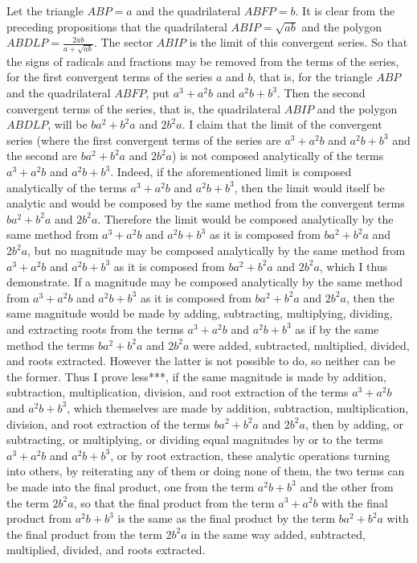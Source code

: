 \documentclass[11pt,letterpaper]{book}
\begin{document}
Let the triangle $ABP = a$ and the quadrilateral $ABFP = b$. It is clear from the
preceding propositions that the quadrilateral $ABIP = \sqrt{ab}$ and the polygon $ABDLP
= \frac{2ab}{a+\sqrt{ab}}$. The sector $ABIP$ is the limit of this convergent
series. So that the signs of radicals and fractions may be removed from the
terms of the series, for the first convergent terms of the series $a$ and $b$,
that is, for the triangle $ABP$ and the quadrilateral $ABFP$, put $a^{3}+a^{2}b$
and $a^{2}b+b^{3}$. Then the second convergent terms of the series, that is, the
quadrilateral $ABIP$ and the polygon $ABDLP$, will be $ba^{2}+b^{2}a$ and $2b^{2}a$. I
claim that the limit of the convergent series (where the first convergent terms
of the series are $a^{3}+a^{2}b$ and $a^{2}b+b^{3}$ and the second are
$ba^{2}+b^{2}a$ and $2b^{2}a$) is not composed analytically of the terms
$a^{3}+a^{2}b$ and $a^{2}b+b^{3}$. Indeed, if the aforementioned limit is
composed analytically of the terms $a^{3}+a^{2}b$ and $a^{2}b+b^{3}$, then the
limit would itself be analytic and would be composed by the same method from
the convergent terms $ba^{2}+b^{2}a$ and $2b^{2}a$. Therefore the limit would
be composed analytically by the same method from $a^{3}+a^{2}b$ and
$a^{2}b+b^{3}$ as it is composed from $ba^{2}+b^{2}a$ and $2b^{2}a$, but no
magnitude may be composed analytically by the same method from $a^{3}+a^{2}b$
and $a^{2}b+b^{3}$ as it is composed from $ba^{2}+b^{2}a$ and $2b^{2}a$, which
I thus demonstrate. If a magnitude may be composed analytically by the same
method from $a^{3}+a^{2}b$ and $a^{2}b+b^{3}$ as it is composed from
$ba^{2}+b^{2}a$ and $2b^{2}a$, then the same magnitude would be made by adding,
subtracting, multiplying, dividing, and extracting roots from the terms
$a^{3}+a^{2}b$ and $a^{2}b+b^{3}$ as if by the same method the terms
$ba^{2}+b^{2}a$ and $2b^{2}a$ were added, subtracted, multiplied, divided, and
roots extracted. However the latter is not possible to do, so neither can be
the former. Thus I prove less***, if the same magnitude is made by addition,
subtraction, multiplication, division, and root extraction of the terms
$a^{3}+a^{2}b$ and $a^{2}b+b^{3}$, which themselves are made by addition,
subtraction, multiplication, division, and root extraction of the terms
$ba^{2}+b^{2}a$ and $2b^{2}a$, then by adding, or subtracting, or multiplying,
or dividing equal magnitudes by or to the terms $a^{3}+a^{2}b$ and
$a^{2}b+b^{3}$, or by root extraction, these analytic operations turning into
others, by reiterating any of them or doing none of them, the two terms can be
made into the final product, one from the term $a^{2}b+b^{3}$ and the other from
the term $2b^{2}a$, so that the final product from the term $a^{3}+a^{2}b$ with
the final product from $a^{2}b+b^{3}$ is the same as the final product by the
term $ba^{2}+b^{2}a$ with the final product from the term $2b^{2}a$ in the same
way added, subtracted, multiplied, divided, and roots extracted.
\end{document}
